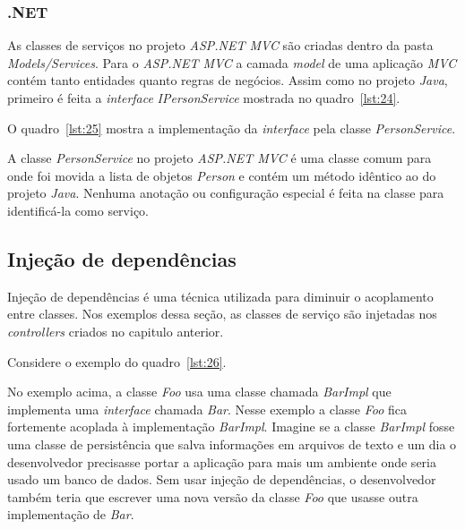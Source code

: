 \documentclass[a4paper,12pt]{article}
\newcommand{\est}[1] {
\textit{#1}}
\newcommand{\classe}[1] {
\textit{#1}}
\newcommand{\arquivo}[1] {
\textit{#1}}
\newcommand{\sigla}[1] {
\textit{#1}}
\newcommand{\lang}[1] {
\textit{#1}}
\newcommand{\javacode}[3] {
	
}
\newcommand{\sharpcode}[3] {
	
}
\begin{document}
\subsubsection{.NET}

As classes de serviços no projeto \est{ASP.NET MVC} são criadas dentro da pasta \arquivo{Models/Services}. Para o \est{ASP.NET MVC} a camada \est{model} de uma aplicação \sigla{MVC} contém tanto entidades quanto regras de negócios. Assim como no projeto \lang{Java}, primeiro é feita a \est{interface} \classe{IPersonService} mostrada no quadro~\ref{lst:24}.

\sharpcode{code/24.txt}{\est{Interface} \classe{IPersonService}}{lst:24}

O quadro~\ref{lst:25} mostra a implementação da \est{interface} pela classe \classe{PersonService}.

\sharpcode{code/25.txt}{Classe \classe{PersonService}}{lst:25}

A classe \classe{PersonService} no projeto \est{ASP.NET MVC} é uma classe comum para onde foi movida a lista de objetos \classe{Person} e contém um método idêntico ao do projeto \lang{Java}. Nenhuma anotação ou configuração especial é feita na classe para identificá-la como serviço.

\subsection{Injeção de dependências}

Injeção de dependências é uma técnica utilizada para diminuir o acoplamento entre classes. Nos exemplos dessa seção, as classes de serviço são injetadas nos \est{controllers} criados no capitulo anterior. 

Considere o exemplo do quadro~\ref{lst:26}.

\javacode{code/26.txt}{Exemplo de classes fortemente acopladas}{lst:26}

No exemplo acima, a classe \classe{Foo} usa uma classe chamada \classe{BarImpl} que implementa uma \est{interface} chamada \classe{Bar}. Nesse exemplo a classe \classe{Foo} fica fortemente acoplada à implementação \classe{BarImpl}. Imagine se a classe \classe{BarImpl} fosse uma classe de persistência que salva informações em arquivos de texto e um dia o desenvolvedor precisasse portar a aplicação para mais um ambiente onde seria usado um banco de dados. Sem usar injeção de dependências, o desenvolvedor também teria que escrever uma nova versão da classe \classe{Foo} que usasse outra implementação de \classe{Bar}.
\end{document}
